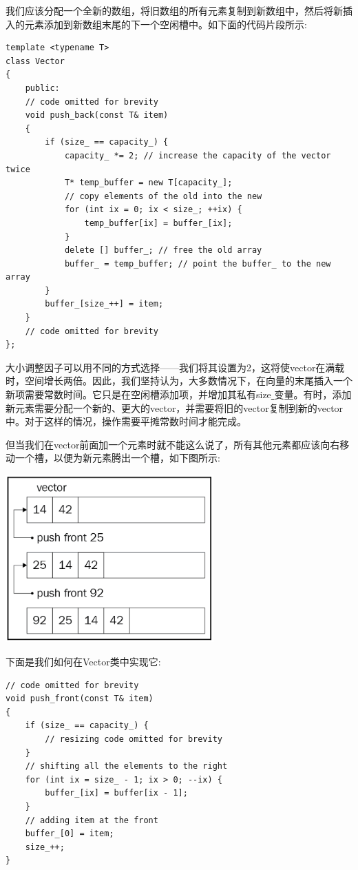 我们应该分配一个全新的数组，将旧数组的所有元素复制到新数组中，然后将新插入的元素添加到新数组末尾的下一个空闲槽中。如下面的代码片段所示: \par

\begin{lstlisting}[caption={}]
template <typename T>
class Vector
{
	public:
	// code omitted for brevity
	void push_back(const T& item)
	{
		if (size_ == capacity_) {
			capacity_ *= 2; // increase the capacity of the vector twice
			T* temp_buffer = new T[capacity_];
			// copy elements of the old into the new
			for (int ix = 0; ix < size_; ++ix) {
				temp_buffer[ix] = buffer_[ix];
			}
			delete [] buffer_; // free the old array
			buffer_ = temp_buffer; // point the buffer_ to the new array
		}
		buffer_[size_++] = item;
	}
	// code omitted for brevity
};
\end{lstlisting}

大小调整因子可以用不同的方式选择——我们将其设置为2，这将使vector在满载时，空间增长两倍。因此，我们坚持认为，大多数情况下，在向量的末尾插入一个新项需要常数时间。它只是在空闲槽添加项，并增加其私有size\underline{ }变量。有时，添加新元素需要分配一个新的、更大的vector，并需要将旧的vector复制到新的vector中。对于这样的情况，操作需要平摊常数时间才能完成。 \par
但当我们在vector前面加一个元素时就不能这么说了，所有其他元素都应该向右移动一个槽，以便为新元素腾出一个槽，如下图所示: \par

\begin{center}
	\includegraphics[width=0.6\textwidth]{content/Section-2/Chapter-6/4}
\end{center}

下面是我们如何在Vector类中实现它: \par

\begin{lstlisting}[caption={}]
// code omitted for brevity
void push_front(const T& item)
{
	if (size_ == capacity_) {
		// resizing code omitted for brevity
	}
	// shifting all the elements to the right
	for (int ix = size_ - 1; ix > 0; --ix) {
		buffer_[ix] = buffer[ix - 1];
	}
	// adding item at the front
	buffer_[0] = item;
	size_++;
}
\end{lstlisting}


